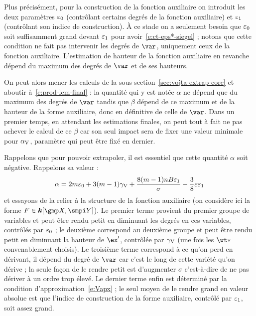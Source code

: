 Plus précisément, pour la construction de la fonction auxiliaire on introduit
les deux paramètres \( \varepsilon\sb0 \) (contrôlant certains degrés de la fonction
auxiliaire) et \( \varepsilon\sb1 \) (contrôlant son indice de construction). À ce
stade on a seulement besoin que \( \varepsilon\sb0 \) soit suffisamment grand devant \(
  \varepsilon\sb1 \) pour avoir~\eqref{e:ct-eps*-siegel} ; notons que cette condition ne
fait pas intervenir les degrés de \( \var \), uniquement ceux de la
fonction auxiliaire. L'estimation de hauteur de la fonction auxiliaire en
revanche dépend du maximum des degrés de \( \var \) et de ses hauteurs.

On peut alors mener les calculs de la sous-section~\vref{sec:vojta-extrap-core}
et aboutir à~\eqref{e:prod-lem-final} : la quantité qui y est notée \(
  \alpha \) ne dépend que du maximum des degrés de \( \var \) tandis que \(
  \beta \) dépend de ce maximum et de la hauteur de la forme auxiliaire, donc
en définitive de celle de \( \var \). Dans un premier temps, en attendant les
estimations finales, on peut tout à fait ne pas achever le calcul de ce \(
  \beta \) car son seul impact sera de fixer une valeur minimale pour \( \alpha \sb{\mathrm{V}}
\), paramètre qui peut être fixé en dernier.

Rappelons que pour pouvoir extrapoler, il est essentiel que cette
quantité \( \alpha \) soit négative. Rappelons sa valeur :
\begin{equation}
  \alpha
  =
  2 m \varepsilon\sb0
  + 3 (m - 1) \gamma \sb{\mathrm{V}}
  + \frac{8 (m - 1) n B \varepsilon\sb1}{\sigma}
  - \frac38 \varepsilon \varepsilon\sb1
\end{equation}
et essayons de la relier à la structure de la fonction auxiliaire (on
considère ici la forme \( F \in \cdn[\vmp, \vmpi] \)). Le premier terme
provient du premier groupe de variables et peut être rendu petit en
diminuant les degrés en ces variables, contrôlés par \( \varepsilon\sb0 \) ; le deuxième
correspond au deuxième groupe et peut être rendu petit en diminuant la hauteur
de \( \ex' \), contrôlée par \( \gamma \sb{\mathrm{V}} \) (une fois les \( \wt* \)
convenablement choisis). Le troisième terme correspond à ce qu'on perd en
dérivant, il dépend du degré de \( \var \) car c'est le long de cette variété
qu'on dérive ; la seule façon de le rendre petit est d'augmenter \( \sigma \)
c'est-à-dire de ne pas dériver à un ordre trop élevé. Le dernier terme enfin
est déterminé par la condition d'approximation~\eqref{e:Vapx} ; le seul moyen
de le rendre grand en valeur absolue est que l'indice de construction de la
forme auxiliaire, contrôlé par \( \varepsilon\sb1 \), soit assez grand.

